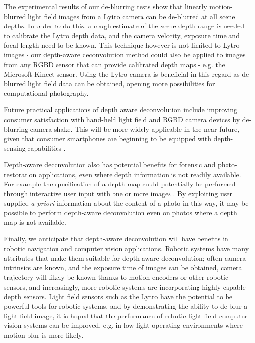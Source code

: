 The experimental results of our de-blurring tests show that linearly motion-blurred light field images from a Lytro camera can be de-blurred at all scene depths.
In order to do this, a rough estimate of the scene depth range is needed to calibrate the Lytro depth data, and the camera velocity, exposure time and focal length need to be known.
This technique however is not limited to Lytro images - our depth-aware deconvolution method could also be applied to images from any RGBD sensor that can provide calibrated depth maps - e.g. the Microsoft Kinect sensor. 
Using the Lytro camera is beneficial in this regard as de-blurred light field data can be obtained, opening more possibilities for computational photography.

Future practical applications of depth aware deconvolution include improving consumer satisfaction with hand-held light field and RGBD camera devices by de-blurring camera shake.
This will be more widely applicable in the near future, given that consumer smartphones are beginning to be equipped with depth-sensing capabilities \cite{google2014lensblur, google2014tango}.

Depth-aware deconvolution also has potential benefits for forensic and photo-restoration applications, even where depth information is not readily available.
For example the specification of a depth map could potentially be performed through interactive user input with one or more images \cite{sinha2008interactive}.
By exploiting user supplied \emph{a-priori} information about the content of a photo in this way, it may be possible to perform depth-aware deconvolution even on photos where a depth map is not available. 

Finally, we anticipate that depth-aware deconvolution will have benefits in robotic navigation and computer vision applications.
Robotic systems have many attributes that make them suitable for depth-aware deconvolution; often camera intrinsics are known, and the exposure time of images can be obtained, camera trajectory will likely be known thanks to motion encoders or other robotic sensors, and increasingly, more robotic systems are incorporating highly capable depth sensors.
Light field sensors such as the Lytro have the potential to be powerful tools for robotic systems, and by demonstrating the ability to de-blur a light field image, it is hoped that the performance of robotic light field computer vision systems can be improved, e.g. in low-light operating environments where motion blur is more likely.


